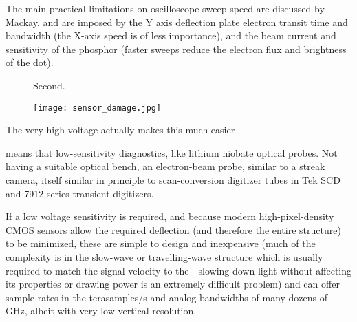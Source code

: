 \documentclass[paper.tex]{subfiles}
\begin{document}
The main practical limitations on oscilloscope sweep speed are discussed by Mackay\cite{New1948}, and are imposed by the Y axis deflection plate electron transit time and bandwidth (the X-axis speed is of less importance), and the beam current and sensitivity of the phosphor (faster sweeps reduce the electron flux and brightness of the dot).


\begin{figure}[H]
	\centering
	\hfill
		\hfill

	\caption{Second.}
		\hfill

\end{figure}



\begin{figure}[H]
	\captionsetup{singlelinecheck = false, justification=justified}
	\centering
	\texttt{[image: sensor\_damage.jpg]}
	\caption{}
\end{figure}


\begin{figure}[H]
	\captionsetup{singlelinecheck = false, justification=justified}
	\centering
	
	\caption{}
\end{figure}


The very high voltage actually makes this much easier

means that low-sensitivity diagnostics, like lithium niobate optical probes. Not having a suitable optical bench, an electron-beam probe, similar to a streak camera, itself similar in principle to scan-conversion digitizer tubes in Tek SCD and 7912 series transient digitizers.

If a low voltage sensitivity is required, and because modern high-pixel-density CMOS sensors allow the required deflection (and therefore the entire structure) to be minimized, these are simple to design and inexpensive (much of the complexity is in the slow-wave or travelling-wave structure which is usually required to match the signal velocity to the - slowing down light without affecting its properties or drawing power is an extremely difficult problem) and can offer sample rates in the terasamples/s and analog bandwidths of many dozens of GHz, albeit with very low vertical resolution. 
\end{document}
